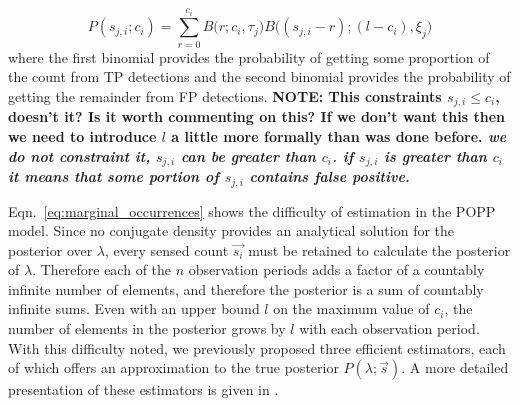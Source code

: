 \begin{equation}
	\label{eq:joint_binomial_distribution}
    P(s_{j,i} ; c_i) \! = \! \! \! \displaystyle\sum_{r = 0}^{c_{i}} \! \! B\Big(r ; c_i, \tau_j\Big) B\Big((s_{j,i} - r) ; (l - c_{i}), \xi_j \Big)
\end{equation}
\noindent where the first binomial provides the probability of getting some proportion of the count from  TP detections and the second binomial provides the probability of getting the remainder from FP detections. \textbf{NOTE: This constraints $s_{j,i} \leq c_i$, doesn't it? Is it worth commenting on this? If we don't want this then we need to introduce $l$ a little more formally than was done before. \emph{we do not constraint it, $s_{j, i}$ can be greater than $c_i$. if $s_{j, i}$ is greater than $c_i$ it means that some portion of $s_{j, i}$ contains false positive.}}

Eqn.~\ref{eq:marginal_occurrences} shows the difficulty of estimation in the POPP model. Since no conjugate density provides an analytical solution for the posterior over $\lambda$, every sensed count $\vec{s_i}$ must be retained to calculate the posterior of $\lambda$. Therefore each of the $n$ observation periods adds a factor of a countably infinite number of elements, and therefore the posterior is a sum of countably infinite sums. Even with an upper bound $l$ on the maximum value of $c_i$, the number of elements in the posterior grows by $l$ with each observation period.
% 
With this difficulty noted, we previously proposed three efficient estimators, each of which offers an approximation to the true posterior $P(\lambda ; \vec{s})$. A more detailed presentation of these estimators is given in \cite{jovan18a}.
